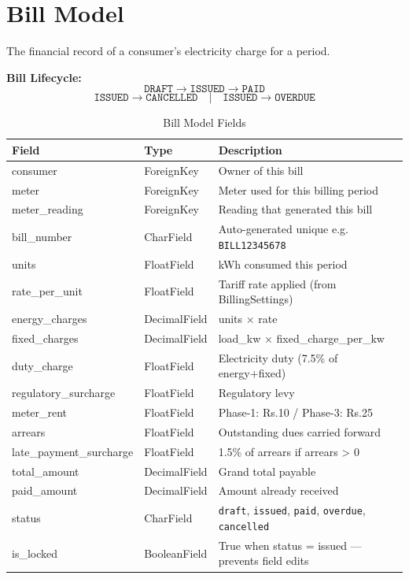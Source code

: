 \documentclass[12pt, a4paper]{report}
\begin{document}
\section{Bill Model}

The financial record of a consumer's electricity charge for a period.

\textbf{Bill Lifecycle:}
\[
\texttt{DRAFT} \rightarrow \texttt{ISSUED} \rightarrow \texttt{PAID}
\]
\[
\texttt{ISSUED} \rightarrow \texttt{CANCELLED} \quad | \quad \texttt{ISSUED} \rightarrow \texttt{OVERDUE}
\]

\begin{table}[H]
\centering
\caption{Bill Model Fields}
\begin{tabularx}{\textwidth}{>{\ttfamily}l l X}
\toprule
\textbf{Field} & \textbf{Type} & \textbf{Description} \\
\midrule
consumer & ForeignKey & Owner of this bill \\
meter & ForeignKey & Meter used for this billing period \\
meter\_reading & ForeignKey & Reading that generated this bill \\
bill\_number & CharField & Auto-generated unique e.g. \texttt{BILL12345678} \\
units & FloatField & kWh consumed this period \\
rate\_per\_unit & FloatField & Tariff rate applied (from BillingSettings) \\
energy\_charges & DecimalField & units × rate \\
fixed\_charges & DecimalField & load\_kw × fixed\_charge\_per\_kw \\
duty\_charge & FloatField & Electricity duty (7.5\% of energy+fixed) \\
regulatory\_surcharge & FloatField & Regulatory levy \\
meter\_rent & FloatField & Phase-1: Rs.10 / Phase-3: Rs.25 \\
arrears & FloatField & Outstanding dues carried forward \\
late\_payment\_surcharge & FloatField & 1.5\% of arrears if arrears > 0 \\
total\_amount & DecimalField & Grand total payable \\
paid\_amount & DecimalField & Amount already received \\
status & CharField & \texttt{draft}, \texttt{issued}, \texttt{paid}, \texttt{overdue}, \texttt{cancelled} \\
is\_locked & BooleanField & True when status = issued — prevents field edits \\

\end{tabularx}
\end{table}
\end{document}
